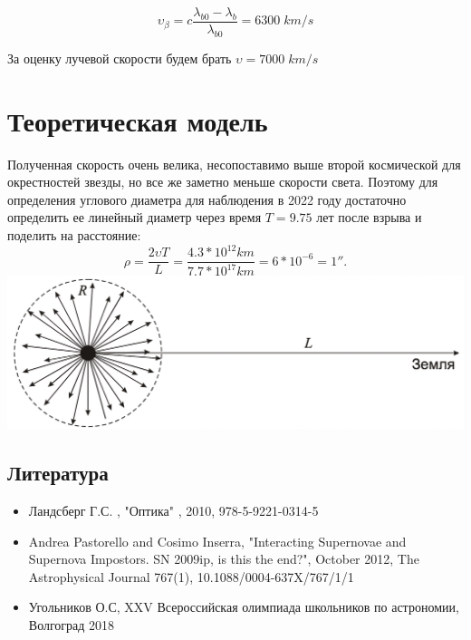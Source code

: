 \documentclass[a4paper, 12pt, openany]{book}
\begin{document}
	\begin{equation}
	\label{eq6}
	\upsilon_{\beta} = c \dfrac{\lambda_{b0} - \lambda_{b}}{\lambda_{b0}} =  6300 \; km/s
	\end{equation}
	
	
	За оценку лучевой скорости будем брать $\upsilon = 7000 \; km/s $

	\section{Теоретическая модель}
	
Полученная скорость очень велика, несопоставимо выше второй космической для окрестностей звезды,  но все же заметно меньше скорости света. Поэтому для определения углового диаметра для наблюдения в 2022 году достаточно определить ее линейный диаметр через время $T = 9.75$ лет после взрыва и поделить на расстояние:
	\begin{equation}
	\label{eq7}
	\rho = \dfrac{2 \upsilon T}{L} = \dfrac{4.3*10^{12} km}{7.7 * 10^{17} km} = 6 * 10^{-6} = 1''.
	\end{equation}
	\includegraphics[scale=0.6]{shema}  
	
	\newpage
	\begin{centering}
	\section{Литература}
	\begin{itemize}
	\item Ландсберг Г.С. , "Оптика" , 2010, 978-5-9221-0314-5
	\item Andrea Pastorello and Cosimo Inserra, "Interacting Supernovae and Supernova Impostors. SN 2009ip, is this the end?", October 2012, The Astrophysical Journal 767(1), 10.1088/0004-637X/767/1/1
	\item Угольников О.С, XXV Всероссийская олимпиада школьников по астрономии, Волгоград 2018
	\end{itemize}
	\end{centering}
\end{document}
